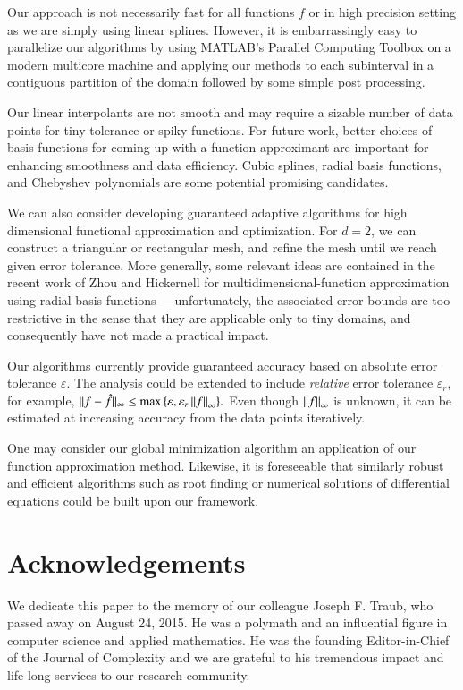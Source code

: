 \documentclass[review]{elsarticle}
\newcommand{\abstol}{\varepsilon}
\theoremstyle{definition}
\begin{document}
Our approach is not necessarily fast for all functions $f$ or in high precision
setting as we are simply using linear splines. However, it is embarrassingly
easy to parallelize our algorithms by using MATLAB's Parallel Computing Toolbox
on a modern multicore machine and applying our methods to each subinterval in a
contiguous partition of the domain followed by some simple post processing.

Our linear interpolants are not smooth and may require a sizable number of data
points for tiny tolerance or spiky functions. For future work, better choices of
basis functions for coming up with a function approximant are important for
enhancing smoothness and data efficiency. Cubic splines, radial basis functions,
and Chebyshev polynomials are some potential promising candidates.

We can also consider developing guaranteed adaptive algorithms for high
dimensional functional approximation and optimization. For $d=2$, we can
construct a triangular or rectangular mesh, and refine the mesh until we reach
given error tolerance. More generally, some relevant ideas are contained in the
recent work of Zhou and Hickernell for multidimensional-function approximation
using radial basis functions~\cite{ZhoHic15a}---unfortunately, the associated
error bounds are too restrictive in the sense that they are applicable only to
tiny domains, and consequently have not made a practical impact.

Our algorithms currently provide guaranteed accuracy based on  absolute error
tolerance $\abstol$. The analysis could be extended to include \emph{relative} error
tolerance $\varepsilon_r$, for example, $ \| f -\hat{f} \|_{\infty} \le \max{
\{\varepsilon, \varepsilon_r \norm[\infty]{f} \} }.$ Even though
$\norm[\infty]{f}$ is unknown, it can be estimated at increasing accuracy from
the data points iteratively.

One may consider our global minimization algorithm an application of our
function approximation method. Likewise, it is foreseeable that
similarly robust and efficient algorithms such as root finding or
numerical solutions of differential equations could be built upon our framework.


\section*{Acknowledgements}
We dedicate this paper to the memory of our colleague Joseph F. Traub, who
passed away on August 24, 2015. He was a polymath and an influential figure in
computer science and applied mathematics. He was the founding Editor-in-Chief of
the Journal of Complexity and we are grateful to his tremendous impact and life
long services to our research community.
\end{document}
